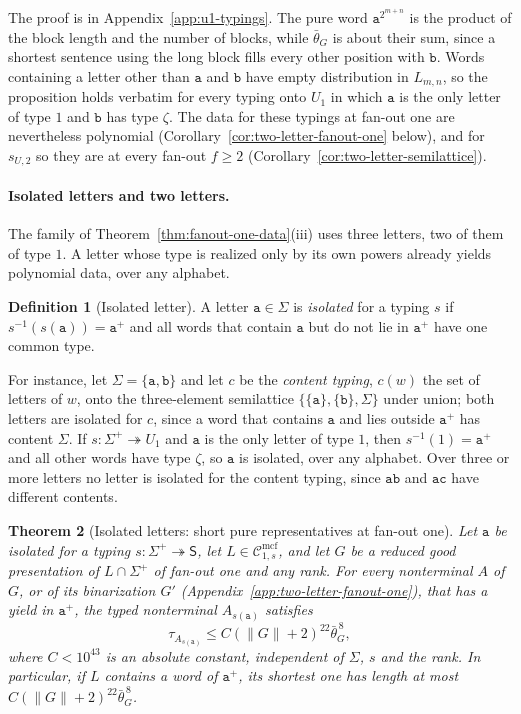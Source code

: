 \documentclass[11pt]{article}
\numberwithin{equation}{section}
\theoremstyle{plain}
\newtheorem{theorem}{Theorem}[section]
\theoremstyle{definition}
\newtheorem{definition}[theorem]{Definition}
\theoremstyle{remark}
\newcommand{\Cmcf}[2]{\mathcal{C}^{\mathrm{mcf}}_{#1,#2}}
\theoremstyle{plain}
\begin{document}
The proof is in Appendix~\ref{app:u1-typings}.  The pure word
$\mathtt a^{2^{m+n}}$ is the product of the block length and the number of
blocks, while $\bar\theta_G$ is about their sum, since a shortest sentence using
the long block fills every other position with $\mathtt b$.  Words containing a
letter other than $\mathtt a$ and $\mathtt b$ have empty distribution in
$L_{m,n}$, so the proposition holds verbatim for every typing onto $U_1$ in
which $\mathtt a$ is the only letter of type $1$ and $\mathtt b$ has type $\zeta$.
The data for these typings at fan-out one are nevertheless polynomial
(Corollary~\ref{cor:two-letter-fanout-one} below), and for $s_{U,2}$ so they are
at every fan-out $f\ge2$ (Corollary~\ref{cor:two-letter-semilattice}).

\paragraph{Isolated letters and two letters.}
The family of Theorem~\ref{thm:fanout-one-data}(iii) uses three letters, two of
them of type $1$.  A letter whose type is realized only by its own powers
already yields polynomial data, over any alphabet.

\begin{definition}[Isolated letter]
\label{def:isolated-letter}
A letter $\mathtt a\in\Sigma$ is \emph{isolated} for a typing $s$ if
$s^{-1}(s(\mathtt a))=\mathtt a^+$ and all words that contain $\mathtt a$ but do
not lie in $\mathtt a^+$ have one common type.
\end{definition}

For instance, let $\Sigma=\{\mathtt a,\mathtt b\}$ and let $c$ be the
\emph{content typing}, $c(w)$ the set of letters of $w$, onto the
three-element semilattice $\{\{\mathtt a\},\{\mathtt b\},\Sigma\}$ under union;
both letters are isolated for $c$, since a word that contains $\mathtt a$ and
lies outside $\mathtt a^+$ has content $\Sigma$.  If $s:\Sigma^+\twoheadrightarrow
U_1$ and $\mathtt a$ is the only letter of type $1$, then $s^{-1}(1)=\mathtt a^+$
and all other words have type $\zeta$, so $\mathtt a$ is isolated, over any
alphabet.  Over three or more letters no letter is isolated for the content
typing, since $\mathtt{ab}$ and $\mathtt{ac}$ have different contents.

\begin{theorem}[Isolated letters: short pure representatives at fan-out one]
\label{thm:two-letter-fanout-one}
Let $\mathtt a$ be isolated for a typing $s:\Sigma^+\twoheadrightarrow\mathsf S$,
let $L\in\Cmcf{1}{s}$, and let $G$ be a reduced good presentation of
$L\cap\Sigma^+$ of fan-out one and any rank.  For every nonterminal $A$ of $G$,
or of its binarization $G'$ \textup(Appendix~\ref{app:two-letter-fanout-one}\textup),
that has a yield in $\mathtt a^+$, the typed nonterminal $A_{s(\mathtt a)}$
satisfies
\[
 \tau_{A_{s(\mathtt a)}}\le C(\|G\|+2)^{22}\bar\theta_G^{\,8},
\]
where $C<10^{43}$ is an absolute constant, independent of $\Sigma$, $s$ and the
rank.  In particular, if $L$ contains a word of $\mathtt a^+$, its shortest one
has length at most $C(\|G\|+2)^{22}\bar\theta_G^{\,8}$.
\end{theorem}
\end{document}
